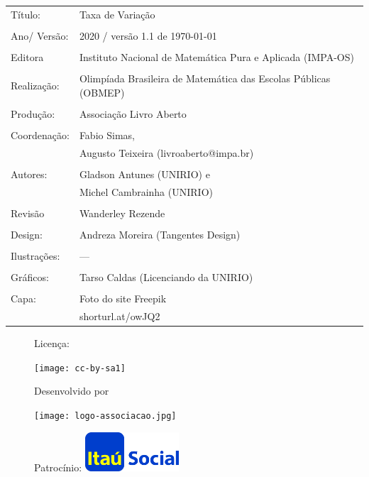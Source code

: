 \begin{tabular}{p{}p{}}
Título: & Taxa de Variação\\
\\
Ano/ Versão: & 2020 / versão 1.1 de \today\\
\\
Editora & Instituto Nacional de Matem\'atica Pura e Aplicada (IMPA-OS)\\
\\
Realização:& Olimp\'iada Brasileira de Matem\'atica das Escolas P\'ublicas (OBMEP)\\
\\
Produção:& Associação Livro Aberto\\
\\
Coordenação:& Fabio Simas, \\ 
			& Augusto Teixeira (livroaberto@impa.br)\\
\\
Autores: & Gladson Antunes (UNIRIO) e\\
         & Michel Cambrainha (UNIRIO) \\
\\
Revisão &  Wanderley Rezende\\
                
\\
Design: & Andreza Moreira (Tangentes Design) \\
\\
  Ilustrações: & --- \\ 
\\
Gráficos: & Tarso Caldas (Licenciando da UNIRIO)\\
\\
  Capa: & Foto do site Freepik \\
  		& shorturl.at/owJQ2 \\

\end{tabular}

\begin{figure}[b]
\begin{minipage}[l]{5cm}
\centering

{\large Licença:}

  \texttt{[image: cc-by-sa1]}
\end{minipage}\hfill
\begin{minipage}[c]{5cm}
\centering
{\large Desenvolvido por}

\texttt{[image: logo-associacao.jpg]}
\end{minipage}
\begin{minipage}[r]{5cm}
\centering

{\large Patrocínio:}
  \vspace{1em}
  \includegraphics[width=3.5cm]{itau}
\end{minipage}
\end{figure}

